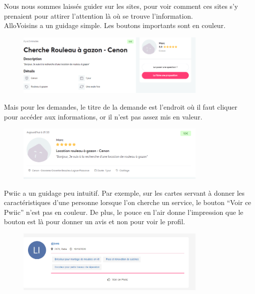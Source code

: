 \documentclass[a4paper,11pt]{article}
\begin{document}
Nous nous sommes laissés guider sur les sites, pour voir comment ces sites s’y prenaient pour attirer
l’attention là où se trouve l’information.\\

AlloVoisins a un guidage simple. Les boutons importants sont en couleur.\\

\begin{figure}[H]
  \includegraphics[width=350px]{images/Guidage-allovoisins.png}
  \label{fig:Guidage-allovoisins}
\end{figure}

Mais pour les demandes, le titre de la demande est l’endroit où il faut cliquer pour accéder aux informations,
or il n’est pas assez mis en valeur.\\

\begin{figure}[H]
  \includegraphics[width=350px]{images/demande-allovoisins.png}
  \label{fig:demande-allovoisins}
\end{figure}

Pwiic a un guidage peu intuitif. Par exemple, sur les cartes servant à donner les caractéristiques d’une personne
lorsque l’on cherche un service, le bouton “Voir ce Pwiic” n’est pas en couleur. De plus, le pouce en l’air donne
l’impression que le bouton est là pour donner un avis et non pour voir le profil.\\

\begin{figure}[H]
  \includegraphics[width=350px]{images/guidage-pwiic.png}
  \label{fig:guidage-pwiic}
\end{figure}
\end{document}

